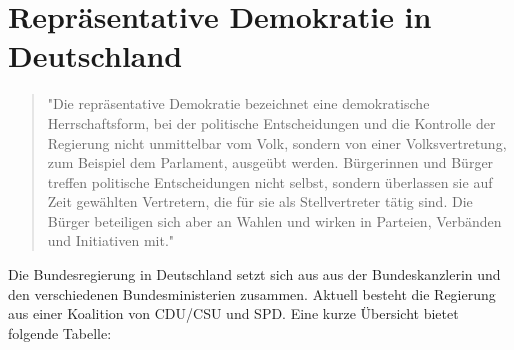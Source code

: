 \section{Repräsentative Demokratie in Deutschland}
\begin{quote}
"Die repräsentative Demokratie bezeichnet eine demokratische Herrschaftsform, bei der politische Entscheidungen und die Kontrolle der Regierung nicht unmittelbar vom Volk, sondern von einer Volksvertretung, zum Beispiel dem Parlament, ausgeübt werden.
Bürgerinnen und Bürger treffen politische Entscheidungen nicht selbst, sondern überlassen sie auf Zeit gewählten Vertretern, die für sie als Stellvertreter tätig sind. Die Bürger beteiligen sich aber an Wahlen und wirken in Parteien, Verbänden und Initiativen mit."
\end{quote}
\cite{bundestag}
Die Bundesregierung in Deutschland setzt sich aus aus der Bundeskanzlerin und den verschiedenen Bundesministerien zusammen. Aktuell besteht die Regierung aus einer Koalition von CDU/CSU und SPD. Eine kurze Übersicht bietet folgende Tabelle: \\
